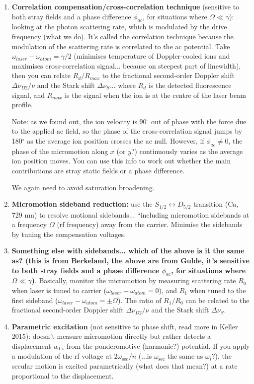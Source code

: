 \documentclass{article}
\begin{document}
\begin{enumerate}
\item \textbf{Correlation compensation/cross-correlation technique} (sensitive to both stray fields and a phase difference $\phi_{ac}$, for situations where $\Omega \ll \gamma$): looking at the photon scattering rate, which is modulated by the drive frequency (what we do). It's called the correlation technique because the modulation of the scattering rate is correlated to the ac potential. Take $\omega_{laser} - \omega_{atom} = \gamma /2$ (minimises temperature of Doppler-cooled ions and maximises cross-correlation signal... because on steepest part of linewidth), then you can relate $R_d / R_{max}$ to the fractional second-order Doppler shift $\Delta \nu_{D2} / \nu$ and the Stark shift $\Delta \nu_S$... where $R_d$ is the detected fluorescence signal, and $R_{max}$ is the signal when the ion is at the centre of the laser beam profile.

Note: as we found out, the ion velocity is 90$^{\circ}$ out of phase with the force due to the applied ac field, so the phase of the cross-correlation signal jumps by 180$^{\circ}$ as the average ion position crosses the ac null. However, if $\phi_{ac} \neq 0$, the phase of the micromotion along $x$ (or $y$?) continuously varies as the average ion position moves. You can use this info to work out whether the main contributions are stray static fields or a phase difference.

We again need to avoid saturation broadening. 

\item \textbf{Micromotion sideband reduction:} use the $S_{1/2} \leftrightarrow D_{5/2}$ transition (Ca, 729 nm) to resolve motional sidebands... ``including micromotion sidebands at a frequency $\Omega$ (rf frequency) away from the carrier. Minimise the sidebands by tuning the compensation voltages.

\item \textbf{Something else with sidebands... which of the above is it the same as? (this is from Berkeland, the above are from Gulde, it's sensitive to both stray fields and a phase difference $\phi_{ac}$, for situations where $\Omega \ll \gamma$)}. Basically, monitor the micromotion by measuring scattering rate $R_0$ when laser is tuned to carrier ($\omega_{laser} - \omega_{atom} = 0$), and $R_1$ when tuned to the first sideband ($\omega_{laser} - \omega_{atom} = \pm \Omega$). The ratio of $R_1/R_0$ can be related to the fractional second-order Doppler shift $\Delta \nu_{D2} / \nu$ and the Stark shift $\Delta \nu_S$.

\item \textbf{Parametric excitation} (not sensitive to phase shift, read more in Keller 2015): doesn't measure micromotion directly but rather detects a displacement $u_{0,i}$ from the ponderomotive (harmonic?) potential. If you apply a modulation of the rf voltage at $2 \omega_{\mathrm{sec}}/n$ (...is $\omega_{\mathrm{sec}}$ the same as $\omega_i$?), the secular motion is excited parametrically (what does that mean?) at a rate proportional to the displacement.
\end{enumerate}
\end{document}
